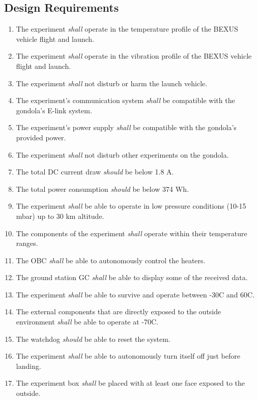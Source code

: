 \subsection{Design Requirements}

\begin{enumerate}[label=D.\arabic*]
    \item The experiment \textit{shall} operate in the temperature profile of the BEXUS vehicle flight and launch.
    \item The experiment \textit{shall} operate in the vibration profile of the BEXUS vehicle flight and launch.
    \item The experiment \textit{shall} not disturb or harm the launch vehicle.
    \item The experiment's communication system \textit{shall} be compatible with the gondola's E-link system.
    \item The experiment's power supply \textit{shall} be compatible with the gondola's provided power.
    \item The experiment \textit{shall} not disturb other experiments on the gondola.
    \item The total DC current draw \textit{should} be below 1.8 A.
    \item The total power consumption \textit{should} be below 374 Wh.
    \item The experiment \textit{shall} be able to operate in low pressure conditions (10-15 mbar) up to 30 km altitude.
    \item The components of the experiment \textit{shall} operate within their temperature ranges.
    \item The OBC \textit{shall} be able to autonomously control the heaters.
    \item The ground station GC \textit{shall} be able to display some of the received data.
    \item The experiment \textit{shall} be able to survive and operate between -30\degree C and 60\degree C.
    \item The external components that are directly exposed to the outside environment \textit{shall} be able to operate at -70\degree C.
    \item The watchdog \textit{should} be able to reset the system.
    \item The experiment \textit{shall} be able to autonomously turn itself off just before landing.
    \item The experiment box \textit{shall} be placed with at least one face exposed to the outside. 
\end{enumerate}